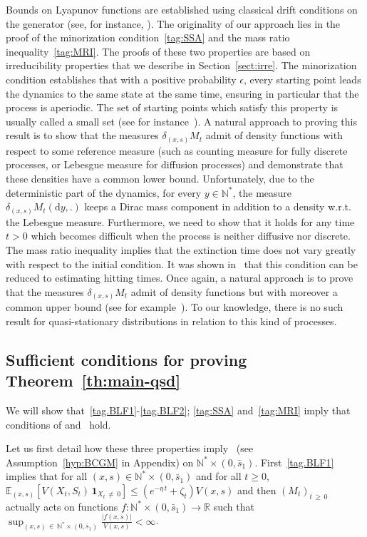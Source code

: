\documentclass[AHL,Unicode,longabstracts,published]{cedram}
\newcommand{\RR}{\mathbb{R}}
\newcommand{\NN}{\mathbb{N}}
\newcommand{\EE}{\mathbb{E}}
\newcommand{\X}{\NN^* \times (0,\bar s_1)}
\newcommand{\dif}{\mathrm{d}}
\newcommand{\1}{\mathbf{1}}
\begin{document}
Bounds on Lyapunov functions are established using classical drift conditions on the generator (see, for instance, \cite[Section~2.4]{BCGM}). The originality of our approach lies in the proof of the minorization condition~\eqref{tag:SSA} and the mass ratio inequality~\eqref{tag:MRI}. The proofs of these two properties are based on irreducibility properties that we describe in Section~\ref{sect:irre}. The minorization condition establishes that with a positive probability $\epsilon$, every starting point leads the dynamics to the same state at the same time, ensuring in particular that the process is aperiodic. The set of starting points which satisfy this property is usually called a small set (see for instance~\cite{MT12}). A natural approach to proving this result is to show that the measures $\delta_{(x,s)} M_t$ admit of density functions with respect to some reference measure (such as counting measure for fully discrete processes, or Lebesgue measure for diffusion processes) and demonstrate that these densities have a common lower bound. Unfortunately, due to the deterministic part of the dynamics, for every $y\in\NN^*$, the measure $\delta_{(x,s)} M_t(\dif y,.)$ keeps a Dirac mass component in addition to a density w.r.t. the Lebesgue measure. Furthermore, we need to show that it holds for any time $t>0$ which becomes difficult when the process is neither diffusive nor discrete. The mass ratio inequality implies that the extinction time does not vary greatly with respect to the initial condition. It was shown in~\cite{CG20} that this condition can be reduced to estimating hitting times. Once again, a natural approach is to prove that the measures $\delta_{(x,s)} M_t$ admit of density functions but with moreover a common upper bound (see for example~\cite{berglund2012mixed}). To our knowledge, there is no such result for quasi-stationary distributions in relation to this kind of processes.



\subsection{Sufficient conditions for proving Theorem~\ref{th:main-qsd}}\label{sec:sufficient.conditions}


We will show that~\eqref{tag.BLF1}-\eqref{tag.BLF2}; \eqref{tag:SSA} and~\eqref{tag:MRI} imply that conditions of \cite[Theorem~5.1]{BCGM} and~\cite[Corollary~2.4]{CV20} hold.



Let us first detail how these three properties imply~\cite[Assumption~A]{BCGM} (see Assumption~\ref{hyp:BCGM} in Appendix) on $\X$. First~\eqref{tag.BLF1} implies that for all $(x,s)\in \X$ and for all $t\geq 0$, $\EE_{(x,s)}[V(X_t, S_t)\,\1_{X_t\,\neq\,0}]\leq (e^{-\eta\,t}+\zeta_t)V(x,s)$ and then $(M_t)_{t\,\geq\,0}$ actually acts on functions $f:\NN^*\times (0, \bar s_1) \to \RR$ such that $\sup_{(x,s)\,\in\,\NN^*\times (0, \bar s_1)}\frac{|f(x,s)|}{V(x,s)}<\infty$.
\end{document}
